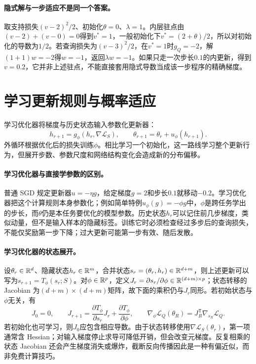 \paragraph{隐式解与一步适应不是同一个答案。}
取支持损失$(v-2)^2/2$、初始化$\theta=0$、$\lambda=1$。内层驻点由$(v-2)+(v-0)=0$得到$v^*=1$，一般初始化下$v^*=(2+\theta)/2$，所以对初始化的导数为$1/2$。若查询损失为$(v-3)^2/2$，在$v^*=1$时$g_Q=-2$，解$(1+1)w=-2$得$w=-1$，返回$\lambda w=-1$。如果只走一次步长$0.1$的内更新，得到$v=0.2$，它并非上述驻点，不能直接套用隐式导数当成该一步程序的精确梯度。

\section{学习更新规则与概率适应}
学习优化器将梯度与历史状态输入参数化更新器：
\begin{equation}
 h_{r+1}=g_\phi(h_r,\nabla\mathcal L_S),\qquad
 \theta_{r+1}=\theta_r+u_\phi(h_{r+1}).
\end{equation}
外循环根据优化后的损失训练$\phi$\cite{andrychowicz2016optimizer}。相比学习一个初始化，这一路线学习整个更新行为，但展开步数、参数尺度和网络结构变化会造成新的分布偏移。

\paragraph{学习优化器与直接学参数的区别。}
普通 SGD 规定更新器$u=-\eta g$，给定梯度$g=2$和步长$0.1$就移动$-0.2$。学习优化器把这个计算规则本身参数化；例如简单特例$u_\phi(g)=-\phi g$中，$\phi$是跨任务学出的步长，而$\theta$仍是本任务要优化的模型参数。历史状态$h_r$可以记住前几步梯度，类似动量，但不是输入样本的隐藏标签。训练它时必须检查经过多步后的查询损失，不能仅奖励第一步下降；过大更新可能第一步有效、随后发散。

\paragraph{学习优化器的状态展开。}
设$\theta_r\in\mathbb{R}^d$、隐藏状态$h_r\in\mathbb{R}^m$，合并状态$s_r=(\theta_r,h_r)\in\mathbb{R}^{d+m}$，则上述更新可以写为$s_{r+1}=T_\phi(s_r;S)$。对$\phi\in\mathbb{R}^p$，定义$J_r=\partial s_r/\partial\phi\in\mathbb{R}^{(d+m)\times p}$；状态转移的 Jacobian 为$(d+m)\times(d+m)$矩阵，故下面的乘积仍与$J_r$同形。若初始状态与$\phi$无关，有
\begin{equation}
 J_0=0,\qquad
 J_{r+1}=\frac{\partial T_\phi}{\partial s_r}J_r
 +\frac{\partial T_\phi}{\partial\phi},\qquad
 \nabla_\phi\mathcal L_Q(\theta_R)
 =J_R^{\mathsf T}\nabla_{s_R}\mathcal L_Q.
\end{equation}
若初始化也可学习，则$J_0$应包含相应导数。由于状态转移使用$\nabla\mathcal L_S(\theta_r)$，第一项通常含 Hessian；对输入梯度停止求导可降低开销，但会改变元梯度。反复相乘的状态 Jacobian 还会产生梯度消失或爆炸，截断反向传播因此是一种有偏近似，而非免费计算技巧。


